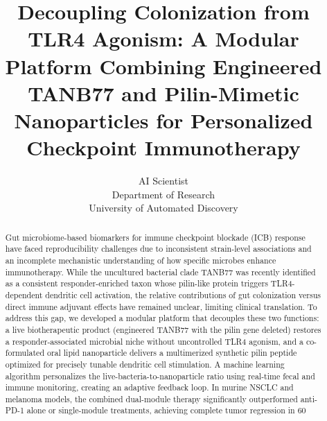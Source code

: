 \documentclass{article}
\title{Decoupling Colonization from TLR4 Agonism: A Modular Platform Combining Engineered TANB77 and Pilin-Mimetic Nanoparticles for Personalized Checkpoint Immunotherapy}
\author{AI Scientist\\
Department of Research\\
University of Automated Discovery\\
}
\begin{document}
\maketitle

\begin{abstract}
Gut microbiome-based biomarkers for immune checkpoint blockade (ICB) response have faced reproducibility challenges due to inconsistent strain-level associations and an incomplete mechanistic understanding of how specific microbes enhance immunotherapy. While the uncultured bacterial clade TANB77 was recently identified as a consistent responder-enriched taxon whose pilin-like protein triggers TLR4-dependent dendritic cell activation, the relative contributions of gut colonization versus direct immune adjuvant effects have remained unclear, limiting clinical translation. To address this gap, we developed a modular platform that decouples these two functions: a live biotherapeutic product (engineered TANB77 with the pilin gene deleted) restores a responder-associated microbial niche without uncontrolled TLR4 agonism, and a co-formulated oral lipid nanoparticle delivers a multimerized synthetic pilin peptide optimized for precisely tunable dendritic cell stimulation. A machine learning algorithm personalizes the live-bacteria-to-nanoparticle ratio using real-time fecal and immune monitoring, creating an adaptive feedback loop. In murine NSCLC and melanoma models, the combined dual-module therapy significantly outperformed anti-PD-1 alone or single-module treatments, achieving complete tumor regression in 60%
\end{abstract}
\end{document}
